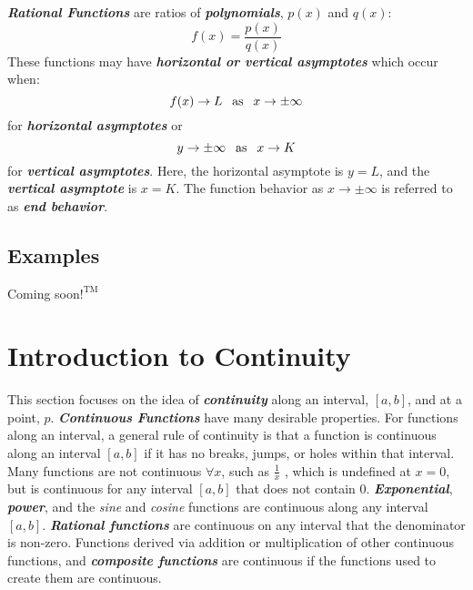 \vspace{0.1in}
\textbf{\textit{Rational Functions}} are ratios of \textbf{\textit{polynomials}}, $p(x)$ and $q(x)$:
\begin{equation}
f(x) = \frac{p(x)}{q(x)}
\end{equation}
These functions may have \textbf{\textit{horizontal or vertical asymptotes}} which occur when:
\begin{equation}
f(x) \rightarrow L \hphantom{-} \text{as} \hphantom{-} x \rightarrow \pm \infty
\end{equation}
for \textbf{\textit{horizontal asymptotes}} or
\begin{equation}
y \rightarrow \pm \infty \hphantom{-} \text{as} \hphantom{-} x \rightarrow K
\end{equation}
for \textbf{\textit{vertical asymptotes}}. Here, the horizontal asymptote is $y = L$, and the \textbf{\textit{vertical asymptote}} is $x = K$.
The function behavior as $x \rightarrow \pm \infty$ is referred to as \textbf{\textit{end behavior}}.

\begin{center}
\section*{\small Examples}
Coming soon$!^{\text{TM}}$
\end{center}

\section{Introduction to Continuity}
This section focuses on the idea of \textbf{\textit{continuity}} along an interval, $[a, b]$, and at a point, $p$. \textbf{\textit{Continuous Functions}} have many desirable properties. For functions along an interval, a general rule of continuity is that a function is continuous along an interval $[a, b]$ if it has no breaks, jumps, or holes within that interval. Many functions are not continuous $\forall x$, such as $\frac{1}{x}$ , which is undefined at $x = 0$, but is continuous for any interval $[a, b]$ that does not contain 0. \textbf{\textit{Exponential}}, \textbf{\textit{power}}, and the \textit{sine} and \textit{cosine} functions are continuous along any interval $[a, b]$. \textbf{\textit{Rational functions}} are continuous on any interval that the denominator is non-zero. Functions derived via addition or multiplication of other continuous functions, and \textbf{\textit{composite functions}} are continuous if the functions used to create them are continuous.

